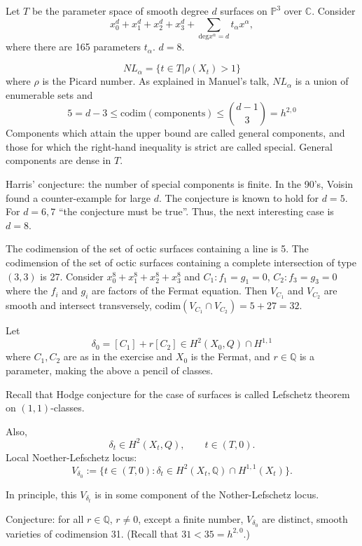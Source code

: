 \medskip\noindent
Let $T $ be the parameter space of smooth
degree $d$ surfaces on $\mathbb{P}^3$ over
$\mathbb{C}$.
Consider
$$
x_0^d+x_1^d+x_2^d+x_3^d
+\sum_{\text{deg}x^\alpha =d}t_\alpha
x^\alpha,
$$
where there are 165 parameters $t_\alpha$.
$d=8$.

$$
NL_\alpha
=
\{t \in T|\rho(X_t)>1\}
$$
where $\rho$ is the Picard number.
As explained in Manuel's talk,
$NL_\alpha$ is a union of enumerable
sets and
$$
5=d-3 \leq  \text{codim}(\text{components} )
\leq \binom{d-1}{3}=h^{2,0}
$$
Components which attain the upper bound
are called general components, and those
for which the right-hand inequality
is strict are called special.
General components are dense in $T$.

Harris' conjecture: the number of special
components is finite.
In the 90's, Voisin found a counter-example
for large $d$.
The conjecture is known to hold
for $d=5$. For $d=6,7$ ``the conjecture
must be true''. Thus, the next interesting
case is $d=8$.

\begin{exercise}
\label{exercise-computation-codim}
The codimension of the set of octic
surfaces containing a line is 5.
The codimension of the set of octic surfaces
containing a complete intersection
of type $(3,3)$ is 27.
Consider $x_0^8+x_1^8+x_2^8+x_3^8$
and $C_1:f_1=g_1=0$, $C_2:f_3=g_3=0$ where
the $f_i$ and $g_i$ are factors
of the Fermat equation. Then $V_{C_1}$
and $V_{C_2}$ are smooth and intersect
transversely, $\text{codim}(V_{C_1}\cap
V_{C_2})=5+27=32$.
\end{exercise}

\noindent
Let
$$
\delta_0=[C_1]+r[C_2]
\in H^2(X_0,Q) \cap H^{1,1} 
$$
where $C_1,C_2$ are as in the
exercise and $X_0$ is the Fermat,
and $r \in \mathbb{Q}$ is a parameter,
making the above a pencil of classes. 

Recall that Hodge conjecture for the case
of surfaces is called Lefschetz theorem
on $(1,1)$-classes.

Also,
$$
\delta_t \in H^2(X_t,Q),\qquad 
t \in (T,0).
$$
Local Noether-Lefschetz locus:
$$
V_{\delta_0}:=
\{t \in (T,0):
\delta_t \in H^2(X_t,\mathbb{Q})
\cap H^{1,1}(X_t)\}.
$$

In principle, this $V_{\delta_t}$
is in some component of the
Nother-Lefschetz locus.

\medskip\noindent
Conjecture: for all $r \in \mathbb{Q}$,
$r \neq  0$, except a finite number,
$V_{\delta_0}$ are distinct, smooth
varieties of codimension 31.
(Recall that $31 < 35 = h^{2,0}$.)


